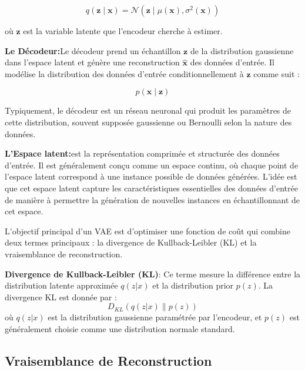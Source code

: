 \begin{equation}
	q(\mathbf{z} \mid \mathbf{x}) = \mathcal{N}(\mathbf{z} \mid \mu(\mathbf{x}), \sigma^2(\mathbf{x}))
	\label{equ:couche}
\end{equation}

où \(\mathbf{z}\) est la variable latente que l'encodeur cherche à estimer.

\medskip

\textbf{Le Décodeur:}Le décodeur prend un échantillon \(\mathbf{z}\) de la distribution gaussienne dans
l'espace latent et génère une reconstruction \(\hat{\mathbf{x}}\) des données d'entrée. Il modélise la distribution
des données d'entrée conditionnellement à \(\mathbf{z}\) comme suit :

\begin{equation}
	p(\mathbf{x} \mid \mathbf{z})
	\label{equ:couche}
\end{equation}

Typiquement, le décodeur est un réseau neuronal qui produit les paramètres de
cette distribution, souvent supposée gaussienne ou Bernoulli selon la nature
des données.

\medskip

\textbf{L'Espace latent:}est la représentation comprimée et structurée des données d'entrée.
Il est généralement conçu comme un espace continu, où chaque point de l'espace latent correspond à une instance
possible de données générées. L'idée est que cet espace latent capture les caractéristiques essentielles
des données d'entrée de manière à permettre
la génération de nouvelles instances en échantillonnant de cet espace.

L’objectif principal d’un VAE est d’optimiser une fonction de coût qui combine
deux termes principaux : la divergence de Kullback-Leibler (KL) et la
vraisemblance de reconstruction.

\textbf{Divergence de Kullback-Leibler (KL)}: Ce terme mesure la différence entre la distribution latente approximée \( q(z | x) \) et la distribution prior \( p(z) \). La divergence KL est donnée par :
\[
	D_{KL}(q(z | x) \parallel p(z))
\]
où \( q(z | x) \) est la distribution gaussienne paramétrée par l'encodeur, et
\( p(z) \) est généralement choisie comme une distribution normale standard.

\subsection*{Vraisemblance de Reconstruction}

